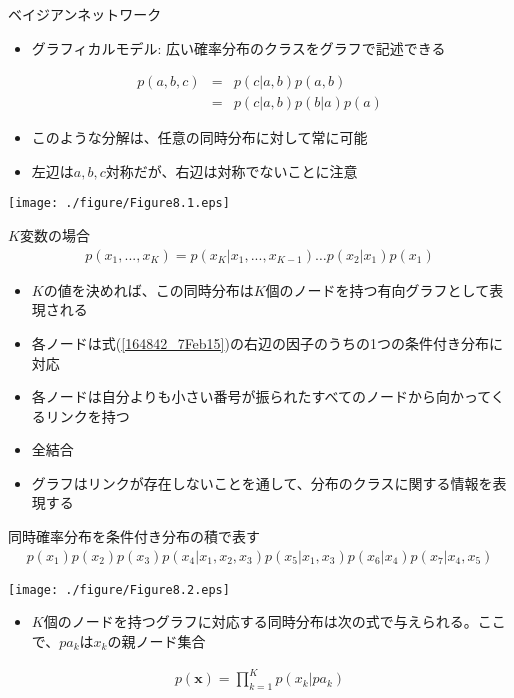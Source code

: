 \begin{frame}{ベイジアンネットワーク}
 \begin{itemize}
  \item グラフィカルモデル: 広い確率分布のクラスをグラフで記述できる
 \end{itemize}
 \begin{eqnarray*}
  p(a,b,c) &=& p(c|a,b)p(a,b) \\
  & =& p(c|a,b)p(b|a)p(a)
 \end{eqnarray*}
 \begin{itemize}
  \item このような分解は、任意の同時分布に対して常に可能
  \item 左辺は$a,b,c$対称だが、右辺は対称でないことに注意
 \end{itemize}
 \begin{center}
  \texttt{[image: ./figure/Figure8.1.eps]}
 \end{center}
\end{frame}

\begin{frame}{$K$変数の場合}
 \begin{eqnarray}
  p(x_1,...,x_K) = p(x_K|x_1,...,x_{K-1})\dots p(x_2|x_1)p(x_1)\label{164842_7Feb15}
 \end{eqnarray}
 \begin{itemize}
  \item $K$の値を決めれば、この同時分布は$K$個のノードを持つ有向グラフとして表現される
  \item 各ノードは式(\ref{164842_7Feb15})の右辺の因子のうちの1つの条件付き分布に対応
  \item 各ノードは自分よりも小さい番号が振られたすべてのノードから向かってくるリンクを持つ
  \item 全結合
  \item グラフはリンクが存在しないことを通して、分布のクラスに関する情報を表現する
 \end{itemize}
\end{frame}

\begin{frame}{同時確率分布を条件付き分布の積で表す}
 \begin{eqnarray*}
  p(x_1)p(x_2)p(x_3)p(x_4|x_1,x_2,x_3)p(x_5|x_1,x_3)p(x_6|x_4)p(x_7|x_4,x_5)
 \end{eqnarray*}
 \begin{center}
  \texttt{[image: ./figure/Figure8.2.eps]}
 \end{center}
 \begin{itemize}
  \item $K$個のノードを持つグラフに対応する同時分布は次の式で与えられる。ここで、$pa_k$は$x_k$の親ノード集合
 \end{itemize}
 \begin{eqnarray*}
  p(\bm{x}) = \prod_{k=1}^{K}p(x_k|pa_k)
 \end{eqnarray*}
\end{frame}

